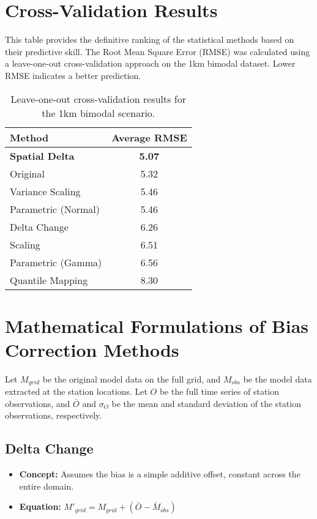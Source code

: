 \documentclass[11pt, a4paper]{article}
\begin{document}
\section{Cross-Validation Results}

This table provides the definitive ranking of the statistical methods based on their predictive skill. The Root Mean Square Error (RMSE) was calculated using a leave-one-out cross-validation approach on the 1km bimodal dataset. Lower RMSE indicates a better prediction.

\begin{table}[h!]
\centering
\caption{Leave-one-out cross-validation results for the 1km bimodal scenario.}
\label{tab:rmse}
\begin{tabular}{lc}
\toprule
\textbf{Method} & \textbf{Average RMSE} \\
\midrule
\textbf{Spatial Delta} & \textbf{5.07} \\
Original & 5.32 \\
Variance Scaling & 5.46 \\
Parametric (Normal) & 5.46 \\
Delta Change & 6.26 \\
Scaling & 6.51 \\
Parametric (Gamma) & 6.56 \\
Quantile Mapping & 8.30 \\
\bottomrule
\end{tabular}
\end{table}

\section{Mathematical Formulations of Bias Correction Methods}

Let $M_{grid}$ be the original model data on the full grid, and $M_{obs}$ be the model data extracted at the station locations. Let $O$ be the full time series of station observations, and $\bar{O}$ and $\sigma_O$ be the mean and standard deviation of the station observations, respectively.

\subsection{Delta Change}
\begin{itemize}
    \item \textbf{Concept:} Assumes the bias is a simple additive offset, constant across the entire domain.
    \item \textbf{Equation:} $M'_{grid} = M_{grid} + (\bar{O} - \bar{M}_{obs})$
\end{itemize}
\end{document}
